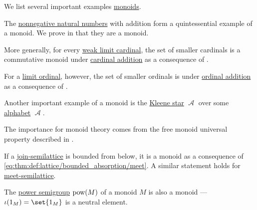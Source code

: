 \begin{example}\label{ex:def:monoid}
  We list several important examples \hyperref[def:monoid]{monoids}.

  \begin{thmenum}
     The \hyperref[def:natural_numbers]{nonnegative natural numbers} with addition form a quintessential example of a monoid. We prove in  that they are a monoid.

     More generally, for every \hyperref[def:successor_and_limit_cardinal/weak_limit]{weak limit cardinal}, the set of smaller cardinals is a commutative monoid under \hyperref[def:cardinal_arithmetic/addition]{cardinal addition} as a consequence of .

     For a \hyperref[def:successor_and_limit_ordinal]{limit ordinal}, however, the set of smaller ordinals is  under \hyperref[def:ordinal_arithmetic/addition]{ordinal addition} as a consequence of .

     Another important example of a monoid is the \hyperref[def:formal_language/kleene_star]{Kleene star} \( \mscrA \) over some \hyperref[def:formal_language]{alphabet} \( \mscrA \).

    The importance for monoid theory comes from the free monoid universal property described in .

     If a \hyperref[def:semilattice]{join-semilattice} is bounded from below, it is a monoid as a consequence of \eqref{eq:thm:def:lattice/bounded_absorption/meet}. A similar statement holds for \hyperref[def:lattice/meet]{meet-semilattice}.

     The \hyperref[def:power_semigroup]{power semigroup} \( \operatorname{pow}(M) \) of a monoid \( M \) is also a monoid --- \( \iota(1_M) = \set{ 1_M } \) is a neutral element.
  \end{thmenum}
\end{example}

